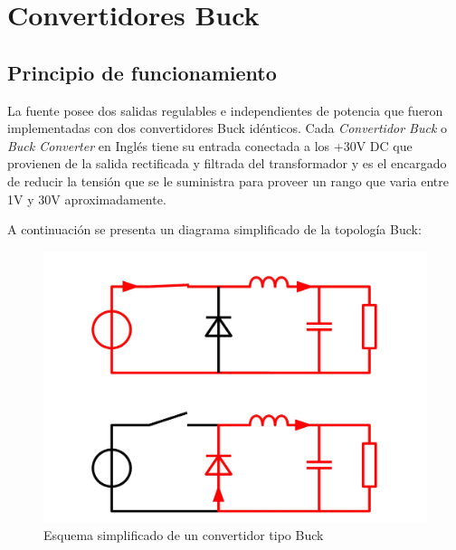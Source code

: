 \documentclass[12pt]{report}
\begin{document}
\chapter{Convertidores Buck}

\section{Principio de funcionamiento}

	La fuente posee dos salidas regulables e independientes de potencia que fueron implementadas con dos convertidores Buck idénticos. Cada \textit{Convertidor Buck} o \textit{Buck Converter} en Inglés tiene su entrada conectada a los +30V DC que provienen de la salida rectificada y filtrada del transformador y es el encargado de reducir la tensión que se le suministra para proveer un rango que varia entre 1V y 30V aproximadamente. 
	
	A continuación se presenta un diagrama simplificado de la topología Buck:
	
	\begin{figure}[H]
		\centering
		\includegraphics[width=\textwidth,height=\textheight,keepaspectratio]{buck_topology}
		\caption{Esquema simplificado de un convertidor tipo Buck}
	\end{figure}
\end{document}
